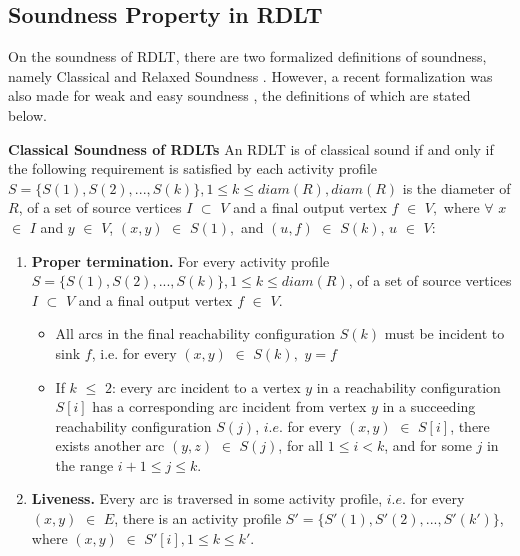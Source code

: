 \subsection*{Soundness Property in RDLT}
On the soundness of RDLT, there are two formalized definitions of soundness, namely Classical and Relaxed Soundness \cite{Malinao2017,MalinaoPJS2023}. However, a recent formalization was also made for weak and easy soundness \cite{Ramirez2024}, the definitions of which are stated below.
\begin{defn}\textbf{Classical Soundness of RDLTs} \cite{MalinaoPJS2023}
    \label{ClassicalRDLTDef}
    An RDLT is of classical sound if and only if the following requirement is satisfied by each activity profile $ S = \{S(1), S(2), ..., S(k)\}, 1 \leq k \leq diam(R), diam(R) $ is the diameter of $ R $, of a set of source vertices $ I $ $ \subset $ $ V $ and a final output vertex $ f $ $ \in $ $ V, $ where $ \forall $ $ x $ $ \in $ $ I $ and $ y $ $ \in $ $ V $, $ (x,y) $ $ \in $ $ S(1), $ and $ (u,f) $ $ \in $ $ S(k) $, $ u $ $ \in $ $ V $:
    \begin{enumerate}
        \item \textbf{Proper termination.} For every activity profile $ S = \{S(1), S(2), ..., S(k)\}, 1 \leq k \leq diam(R) $, of a set of source vertices $ I $ $ \subset $ $ V $ and a final output vertex $ f $ $ \in $ $ V $.
        \begin{itemize}
            \item All arcs in the final reachability configuration $ S(k) $ must be incident to sink $ f $, i.e. for every $ (x,y) $ $ \in $ $ S(k), $ $ y = f $
            \item If $ k $ $ \leq $ $ 2 $: every arc incident to a vertex $ y $ in a reachability configuration $ S[i] $ has a corresponding arc incident from vertex $ y $ in a succeeding reachability configuration $ S(j) $, $ i.e. $ for every $ (x,y) $ $ \in $ $ S[i] $, there exists another arc $ (y,z) $ $ \in $ $ S(j) $, for all $ 1 \leq i < k $, and for some $ j $ in the range $ i + 1 \leq j \leq k $.
        \end{itemize}
        \item \textbf{Liveness.} Every arc is traversed in some activity profile, $ i.e. $ for every $ (x,y) $ $ \in $ $ E $, there is an activity profile $ S' = \{S'(1), S'(2), ..., S'(k')\} $, where $ (x,y) $ $ \in $ $ S'[i], 1 \leq k \leq k' $.
    \end{enumerate}
\end{defn}

